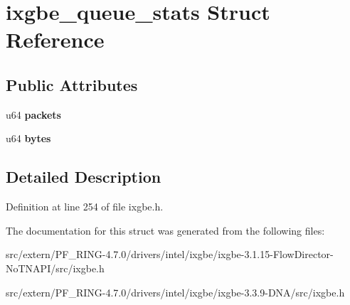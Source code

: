 \hypertarget{structixgbe__queue__stats}{
\section{ixgbe\_\-queue\_\-stats Struct Reference}
\label{structixgbe__queue__stats}
}
\subsection*{Public Attributes}
\begin{DoxyCompactItemize}
\item 
\hypertarget{structixgbe__queue__stats_ac7fd3fc8943d095cb9f3dd04ebff7dbb}{
u64 {\bfseries packets}}
\label{structixgbe__queue__stats_ac7fd3fc8943d095cb9f3dd04ebff7dbb}

\item 
\hypertarget{structixgbe__queue__stats_a26c90505256583ba49611c6936d55f2d}{
u64 {\bfseries bytes}}
\label{structixgbe__queue__stats_a26c90505256583ba49611c6936d55f2d}

\end{DoxyCompactItemize}


\subsection{Detailed Description}


Definition at line 254 of file ixgbe.h.



The documentation for this struct was generated from the following files:\begin{DoxyCompactItemize}
\item 
src/extern/PF\_\-RING-\/4.7.0/drivers/intel/ixgbe/ixgbe-\/3.1.15-\/FlowDirector-\/NoTNAPI/src/ixgbe.h\item 
src/extern/PF\_\-RING-\/4.7.0/drivers/intel/ixgbe/ixgbe-\/3.3.9-\/DNA/src/ixgbe.h\end{DoxyCompactItemize}
